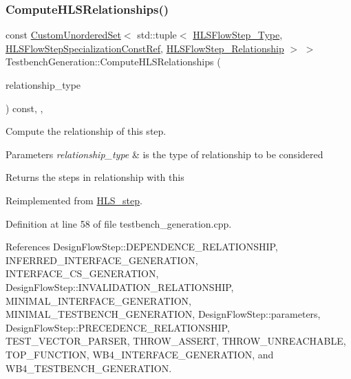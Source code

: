 \subsubsection{\texorpdfstring{Compute\+H\+L\+S\+Relationships()}{ComputeHLSRelationships()}}
{\footnotesize\ttfamily const \hyperlink{classCustomUnorderedSet}{Custom\+Unordered\+Set}$<$ std\+::tuple$<$ \hyperlink{hls__step_8hpp_ada16bc22905016180e26fc7e39537f8d}{H\+L\+S\+Flow\+Step\+\_\+\+Type}, \hyperlink{hls__step_8hpp_a5fdd2edf290c196531d21d68e13f0e74}{H\+L\+S\+Flow\+Step\+Specialization\+Const\+Ref}, \hyperlink{hls__step_8hpp_a3ad360b9b11e6bf0683d5562a0ceb169}{H\+L\+S\+Flow\+Step\+\_\+\+Relationship} $>$ $>$ Testbench\+Generation\+::\+Compute\+H\+L\+S\+Relationships (\begin{DoxyParamCaption}\item[{const \hyperlink{classDesignFlowStep_a723a3baf19ff2ceb77bc13e099d0b1b7}{Design\+Flow\+Step\+::\+Relationship\+Type}}]{relationship\+\_\+type }\end{DoxyParamCaption}) const\hspace{0.3cm}{\ttfamily [override]}, {\ttfamily [protected]}, {\ttfamily [virtual]}}



Compute the relationship of this step. 


\begin{DoxyParams}{Parameters}
{\em relationship\+\_\+type} & is the type of relationship to be considered \\
\hline
\end{DoxyParams}
\begin{DoxyReturn}{Returns}
the steps in relationship with this 
\end{DoxyReturn}


Reimplemented from \hyperlink{classHLS__step_aed0ce8cca9a1ef18e705fc1032ad4de5}{H\+L\+S\+\_\+step}.



Definition at line 58 of file testbench\+\_\+generation.\+cpp.



References Design\+Flow\+Step\+::\+D\+E\+P\+E\+N\+D\+E\+N\+C\+E\+\_\+\+R\+E\+L\+A\+T\+I\+O\+N\+S\+H\+IP, I\+N\+F\+E\+R\+R\+E\+D\+\_\+\+I\+N\+T\+E\+R\+F\+A\+C\+E\+\_\+\+G\+E\+N\+E\+R\+A\+T\+I\+ON, I\+N\+T\+E\+R\+F\+A\+C\+E\+\_\+\+C\+S\+\_\+\+G\+E\+N\+E\+R\+A\+T\+I\+ON, Design\+Flow\+Step\+::\+I\+N\+V\+A\+L\+I\+D\+A\+T\+I\+O\+N\+\_\+\+R\+E\+L\+A\+T\+I\+O\+N\+S\+H\+IP, M\+I\+N\+I\+M\+A\+L\+\_\+\+I\+N\+T\+E\+R\+F\+A\+C\+E\+\_\+\+G\+E\+N\+E\+R\+A\+T\+I\+ON, M\+I\+N\+I\+M\+A\+L\+\_\+\+T\+E\+S\+T\+B\+E\+N\+C\+H\+\_\+\+G\+E\+N\+E\+R\+A\+T\+I\+ON, Design\+Flow\+Step\+::parameters, Design\+Flow\+Step\+::\+P\+R\+E\+C\+E\+D\+E\+N\+C\+E\+\_\+\+R\+E\+L\+A\+T\+I\+O\+N\+S\+H\+IP, T\+E\+S\+T\+\_\+\+V\+E\+C\+T\+O\+R\+\_\+\+P\+A\+R\+S\+ER, T\+H\+R\+O\+W\+\_\+\+A\+S\+S\+E\+RT, T\+H\+R\+O\+W\+\_\+\+U\+N\+R\+E\+A\+C\+H\+A\+B\+LE, T\+O\+P\+\_\+\+F\+U\+N\+C\+T\+I\+ON, W\+B4\+\_\+\+I\+N\+T\+E\+R\+F\+A\+C\+E\+\_\+\+G\+E\+N\+E\+R\+A\+T\+I\+ON, and W\+B4\+\_\+\+T\+E\+S\+T\+B\+E\+N\+C\+H\+\_\+\+G\+E\+N\+E\+R\+A\+T\+I\+ON.

